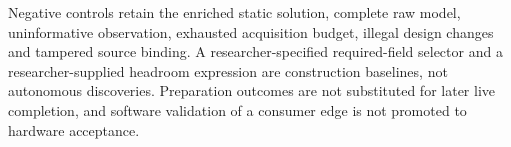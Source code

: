 Negative controls retain the enriched static solution, complete raw model,
uninformative observation, exhausted acquisition budget, illegal design
changes and tampered source binding. A researcher-specified required-field
selector and a researcher-supplied headroom expression are construction
baselines, not autonomous discoveries. Preparation outcomes are not
substituted for later live completion, and software validation of a
consumer edge is not promoted to hardware acceptance.
